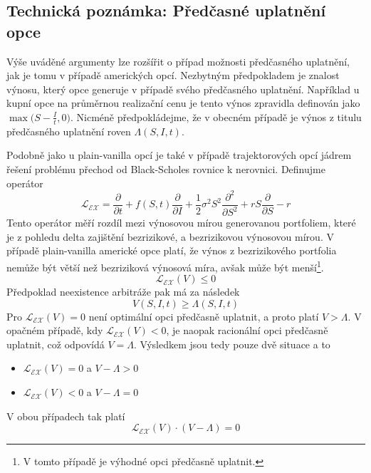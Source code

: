 \documentclass[a4paper]{book}
\begin{document}
\subsection{Technická poznámka: Předčasné uplatnění opce}

Výše uváděné argumenty lze rozšířit o případ možnosti předčasného uplatnění, jak je tomu v případě amerických opcí. Nezbytným předpokladem je znalost výnosu, který opce generuje v případě svého předčasného uplatnění. Například u kupní opce na průměrnou realizační cenu je tento výnos zpravidla definován jako $\max \Big( S - \frac{I}{t}, 0 \Big)$. Nicméně předpokládejme, že v obecném případě je výnos z titulu předčasného uplatnění roven $\Lambda(S,I,t)$.

Podobně jako u plain-vanilla opcí je také v případě trajektorových opcí jádrem řešení problému přechod od Black-Scholes rovnice k nerovnici. Definujme operátor
\begin{equation*}
\mathcal{L}_{\mathcal{EX}} = \frac{\partial}{\partial t} + f(S,t) \frac{\partial}{\partial I} + \frac{1}{2} \sigma^2 S^2 \frac{\partial^2}{\partial S^2} + r S \frac{\partial}{\partial S} - r
\end{equation*}
Tento operátor měří rozdíl mezi výnosovou mírou generovanou portfoliem, které je z pohledu delta zajištění bezrizikové, a bezrizikovou výnosovou mírou. V případě plain-vanilla americké opce platí, že výnos z bezrizikového portfolia nemůže být větší než bezriziková výnosová míra, avšak může být menší\footnote{V tomto případě je výhodné opci předčasně uplatnit.}.
\begin{equation*}
\mathcal{L}_{\mathcal{EX}}(V) \le 0 
\end{equation*}
Předpoklad neexistence arbitráže pak má za následek
\begin{equation*}
V(S,I,t) \ge \Lambda(S,I,t)
\end{equation*}
Pro $\mathcal{L}_{\mathcal{EX}}(V) = 0$ není optimální opci předčasně uplatnit, a proto platí $V > \Lambda$. V opačném případě, kdy $\mathcal{L}_{\mathcal{EX}}(V) < 0$, je naopak racionální opci předčasně uplatnit, což odpovídá $V = \Lambda$. Výsledkem jsou tedy pouze dvě situace a to
\begin{itemize}
\item $\mathcal{L}_{\mathcal{EX}}(V) = 0$ a $V - \Lambda > 0$
\item $\mathcal{L}_{\mathcal{EX}}(V) < 0$ a $V - \Lambda = 0$
\end{itemize}
V obou případech tak platí
\begin{equation*}
\mathcal{L}_{\mathcal{EX}}(V) \cdot (V - \Lambda) = 0
\end{equation*}
\end{document}
